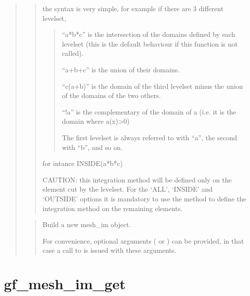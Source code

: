 \documentclass[a4paper,11pt,english]{sphinxmanual}
\begin{document}
\begin{quote}
\begin{quote}
the syntax is very simple, for example if there are 3 different
levelset,
\begin{quote}

“a*b*c” is the intersection of the domains defined by each
levelset (this is the default behaviour if this function is not
called).

“a+b+c” is the union of their domains.

“c\sphinxhyphen{}(a+b)” is the domain of the third levelset minus the union of
the domains of the two others.

“!a” is the complementary of the domain of a (i.e. it is the
domain where a(x)\textgreater{}0)

The first levelset is always referred to with “a”, the second
with “b”, and so on.
\end{quote}

for intance INSIDE(a*b*c)

CAUTION: this integration method will be defined only on the element
cut by the level\sphinxhyphen{}set. For the ‘ALL’, ‘INSIDE’ and ‘OUTSIDE’ options
it is mandatory to use the method  to define
the integration method on the remaining elements.
\end{quote}

\begin{quote}

Build a new mesh\_im object.

For convenience, optional arguments ( or ) can be
provided, in that case a call to  is issued
with these arguments.
\end{quote}
\end{quote}


\section{gf\_mesh\_im\_get}
\label{\detokenize{matlab_octave/cmdref_gf_mesh_im_get:gf-mesh-im-get}}\label{\detokenize{matlab_octave/cmdref_gf_mesh_im_get::doc}}
\end{document}
